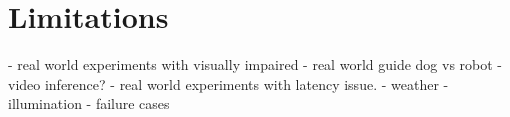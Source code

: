\section{Limitations}
- real world experiments with visually impaired
- real world guide dog vs robot
- video inference?
- real world experiments with latency issue.
- weather
- illumination
- failure cases

